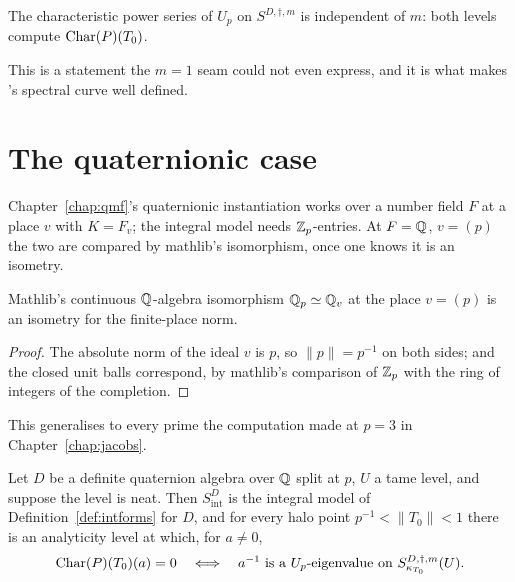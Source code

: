 \begin{corollary}
  \label{cor:level-independence}
  \leanok
  The characteristic power series of $U_p$ on $S^{D,\dagger,m}$ is independent of $m$: both
  levels compute $\operatorname{Char}(P)(T_0)$.
\end{corollary}

This is a statement the $m=1$ seam could not even express, and it is what makes
\cite[Definition 2.13]{LWX}'s spectral curve well defined.

\section{The quaternionic case}

Chapter~\ref{chap:qmf}'s quaternionic instantiation works over a number field $F$ at a place $v$
with $K = F_v$; the integral model needs $\mathbb{Z}_p$-entries.  At $F=\mathbb{Q}$, $v = (p)$ the two are
compared by mathlib's isomorphism, once one knows it is an isometry.

\begin{lemma}
  \label{lem:adic-completion-isometry}
  \leanok
  Mathlib's continuous $\mathbb{Q}$-algebra isomorphism $\mathbb{Q}_p \simeq \mathbb{Q}_v$ at the place $v = (p)$ is an
  isometry for the finite-place norm.
\end{lemma}

\begin{proof}
  \leanok
  The absolute norm of the ideal $v$ is $p$, so $\lVert p\rVert = p^{-1}$ on both sides; and the
  closed unit balls correspond, by mathlib's comparison of $\mathbb{Z}_p$ with the ring of integers of the
  completion.
\end{proof}

This generalises to every prime the computation made at $p=3$ in Chapter~\ref{chap:jacobs}.

\begin{theorem}
  \label{thm:lwx-spectral}
  \leanok
  Let $D$ be a definite quaternion algebra over $\mathbb{Q}$ split at $p$, $U$ a tame level, and suppose
  the level is neat.  Then $S^{D}_{\mathrm{int}}$ is the integral model of
  Definition~\ref{def:intforms} for $D$, and for every halo point $p^{-1}<\lVert T_0\rVert<1$
  there is an analyticity level at which, for $a \neq 0$,
  \[
    \operatorname{Char}(P)(T_0)(a) = 0
    \quad\Longleftrightarrow\quad
    a^{-1} \text{ is a } U_p\text{-eigenvalue on } S^{D,\dagger,m}_{\kappa_{T_0}}(U).
  \]
\end{theorem}

